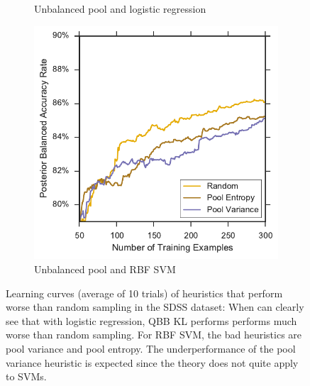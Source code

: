 \begin{figure}[p]
\begin{subfigure}{.5\textwidth}
		\caption{Unbalanced pool and logistic regression}
		\label{fig:sdss_ul_ind_lower}
	\end{subfigure}%
	\begin{subfigure}{.5\textwidth}
		\centering
		\includegraphics[width=\linewidth]{figures/5_active/sdss_ur_ind_lower}
		\caption{Unbalanced pool and RBF SVM}
		\label{fig:sdss_ur_ind_lower}
	\end{subfigure}
	\caption[Learning curves of heuristics worse than random (SDSS)]{
		Learning curves (average of 10 trials) of heuristics that perform worse than random sampling in the SDSS dataset: When can clearly see that with logistic regression,
		QBB KL performs performs much worse than random sampling. For 
		RBF SVM, the bad heuristics are pool variance and pool entropy. The underperformance
		of the pool variance heuristic is expected since the theory does not quite apply
		to SVMs.}
	\label{fig:sdss_ind_lower}
\end{figure}


